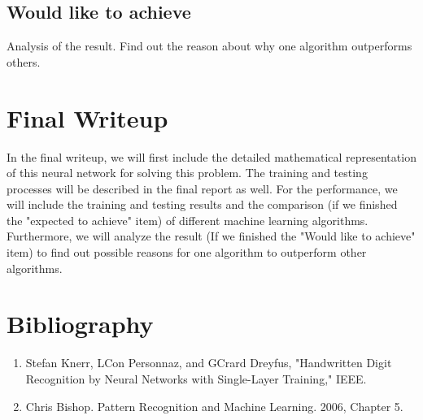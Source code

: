 \documentclass[11pt]{article}
\begin{document}
\subsection{Would like to achieve}
Analysis of the result. Find out the reason about why one algorithm outperforms others.

\section{Final Writeup}
In the final writeup, we will first include the detailed mathematical representation of this neural network for solving this problem. The training and testing processes will be described in the final report as well. For the performance, we will include the training and testing results and the comparison (if we finished the "expected to achieve" item) of different machine learning algorithms. Furthermore, we will analyze the result (If we finished the "Would like to achieve" item) to find out possible reasons for one algorithm to outperform other algorithms.

\section{Bibliography}
\begin{enumerate}
\item Stefan Knerr, LCon Personnaz, and GCrard Dreyfus, "Handwritten Digit Recognition by Neural Networks with Single-Layer Training," IEEE.
\item Chris Bishop. Pattern Recognition and Machine Learning. 2006, Chapter 5.
\end{enumerate}
\end{document}
